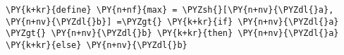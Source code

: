 \begin{Verbatim}[commandchars=\\\{\}]
\PY{k+kr}{define} \PY{n+nf}{max} = \PYZsh{}[\PY{n+nv}{\PYZdl{}a}, \PY{n+nv}{\PYZdl{}b}] =\PYZgt{} \PY{k+kr}{if} \PY{n+nv}{\PYZdl{}a} \PYZgt{} \PY{n+nv}{\PYZdl{}b} \PY{k+kr}{then} \PY{n+nv}{\PYZdl{}a} \PY{k+kr}{else} \PY{n+nv}{\PYZdl{}b}
\end{Verbatim}
